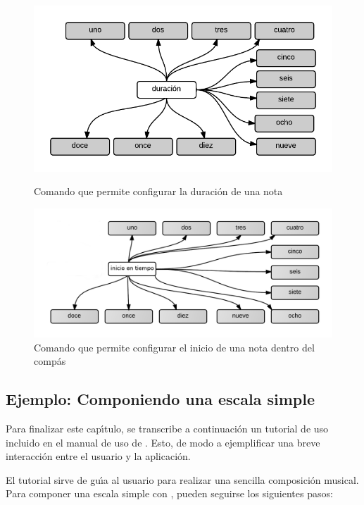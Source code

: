 \begin{figure}[H]
\begin{minipage}[b]{0.5\linewidth}
\centering
\includegraphics[width=0.9\linewidth]{./graphics/cmd-dur.png}
\caption{Comando que permite configurar la duraci\'on de una nota}
\label{figure:cmd-dur}
\end{minipage}
\quad
\begin{minipage}[b]{0.5\linewidth}
\centering
\includegraphics[width=1.1\linewidth]{./graphics/cmd-note-tiempo.png}
\caption{Comando que permite configurar el inicio de una nota dentro del comp\'as}
\label{figure:cmd-note-tiempo}
\end{minipage}
\end{figure}

\subsection{Ejemplo: Componiendo una escala simple}
Para finalizar este cap{\'\i}tulo, se transcribe a continuaci\'on un tutorial de uso incluido en el manual
de uso de . Esto, de modo a ejemplificar una breve interacci\'on entre el usuario
y la aplicaci\'on.

El tutorial sirve de gu{\'\i}a al usuario para realizar una sencilla composici\'on musical.
Para componer una escala simple con , pueden seguirse los siguientes pasos:

